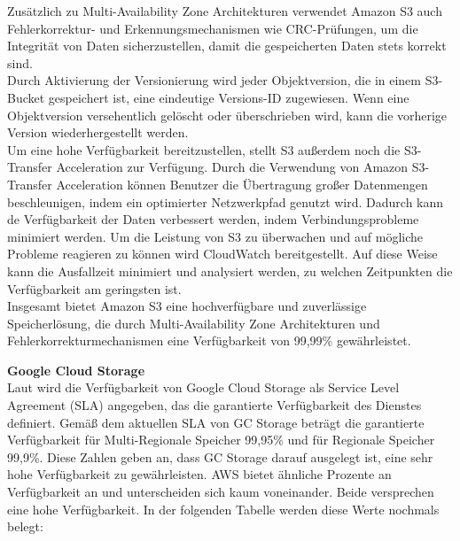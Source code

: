 Zusätzlich zu Multi-Availability Zone Architekturen verwendet Amazon S3 auch Fehlerkorrektur- und Erkennungsmechanismen wie CRC-Prüfungen, um die Integrität von Daten sicherzustellen, damit die gespeicherten Daten stets korrekt sind.\\

Durch Aktivierung der Versionierung wird jeder Objektversion, die in einem S3-Bucket gespeichert ist, eine eindeutige Versions-ID zugewiesen. Wenn eine Objektversion versehentlich gelöscht oder überschrieben wird, kann die vorherige Version wiederhergestellt werden.\\

Um eine hohe Verfügbarkeit bereitzustellen, stellt S3 außerdem noch die S3-Transfer Acceleration zur Verfügung. Durch die Verwendung von Amazon S3-Transfer Acceleration können Benutzer die Übertragung großer Datenmengen beschleunigen, indem ein optimierter Netzwerkpfad genutzt wird. Dadurch kann de Verfügbarkeit der Daten verbessert werden, indem Verbindungsprobleme minimiert werden. Um die Leistung von S3 zu überwachen und auf mögliche Probleme reagieren zu können wird CloudWatch bereitgestellt. Auf diese Weise kann die Ausfallzeit minimiert und analysiert werden, zu welchen Zeitpunkten die Verfügbarkeit am geringsten ist.\\

Insgesamt bietet Amazon S3 eine hochverfügbare und zuverlässige Speicherlösung, die durch Multi-Availability Zone Architekturen und Fehlerkorrekturmechanismen eine Verfügbarkeit von 99,99\% gewährleistet.

\newpage

\textbf{Google Cloud Storage}\\

Laut \cite{gcp-sla} wird die Verfügbarkeit von Google Cloud Storage als Service Level Agreement (SLA) angegeben, das die garantierte Verfügbarkeit des Dienstes definiert. Gemäß dem aktuellen SLA von GC Storage beträgt die garantierte Verfügbarkeit für Multi-Regionale Speicher 99,95\% und für Regionale Speicher 99,9\%. Diese Zahlen geben an, dass GC Storage darauf ausgelegt ist, eine sehr hohe Verfügbarkeit zu gewährleisten. AWS bietet ähnliche Prozente an Verfügbarkeit an und unterscheiden sich kaum voneinander. Beide versprechen eine hohe Verfügbarkeit. In der folgenden Tabelle werden diese Werte nochmals belegt:

